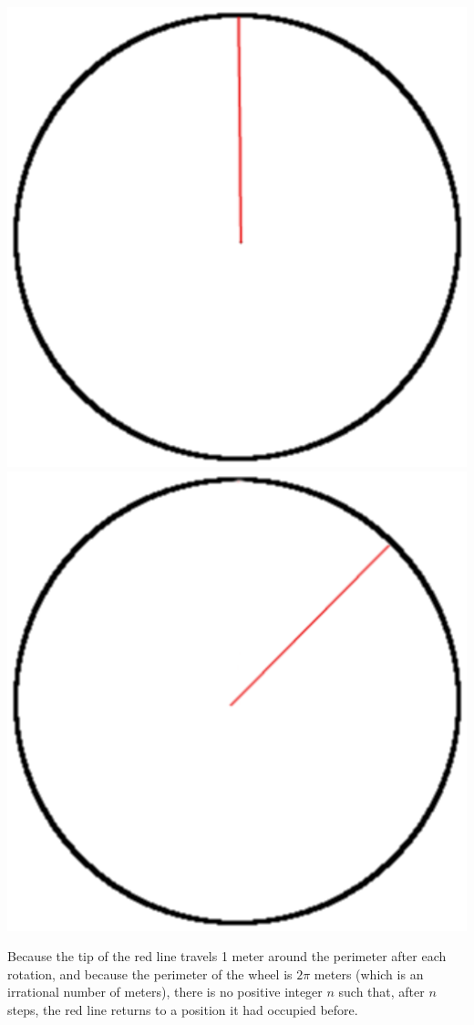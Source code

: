 \documentclass[12pt,a4paper]{article}
\begin{document}
\begin{enumerate}
	\begin{center}
\includegraphics[scale=.2]{base}  \raisebox{13mm}{$\longrightarrow$} \includegraphics[scale=.2]{1rad}
\end{center}
Because the tip of the red line travels 1 meter around the perimeter after each rotation, and because the perimeter of the wheel is $2\pi$ meters (which is an irrational number of meters), there is no positive integer $n$ such that, after $n$ steps, the red line returns to a position it had occupied before.


\end{enumerate}
\end{document}
